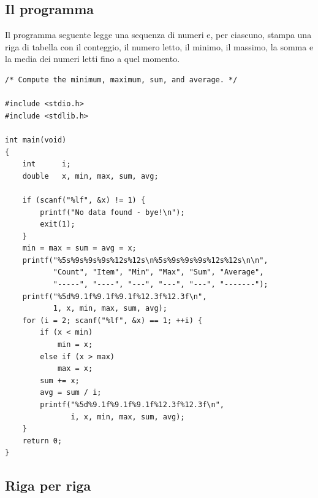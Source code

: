 \subsection{Il programma}

Il programma seguente legge una sequenza di numeri e, per ciascuno, stampa
una riga di tabella con il conteggio, il numero letto, il minimo, il
massimo, la somma e la media dei numeri letti fino a quel momento.

\begin{lstlisting}[style=c, name=running_sum.c]
/* Compute the minimum, maximum, sum, and average. */

#include <stdio.h>
#include <stdlib.h>

int main(void)
{
    int      i;
    double   x, min, max, sum, avg;

    if (scanf("%lf", &x) != 1) {
        printf("No data found - bye!\n");
        exit(1);
    }
    min = max = sum = avg = x;
    printf("%5s%9s%9s%9s%12s%12s\n%5s%9s%9s%9s%12s%12s\n\n",
           "Count", "Item", "Min", "Max", "Sum", "Average",
           "-----", "----", "---", "---", "---", "-------");
    printf("%5d%9.1f%9.1f%9.1f%12.3f%12.3f\n",
           1, x, min, max, sum, avg);
    for (i = 2; scanf("%lf", &x) == 1; ++i) {
        if (x < min)
            min = x;
        else if (x > max)
            max = x;
        sum += x;
        avg = sum / i;
        printf("%5d%9.1f%9.1f%9.1f%12.3f%12.3f\n",
               i, x, min, max, sum, avg);
    }
    return 0;
}
\end{lstlisting}

\subsection{Riga per riga}

